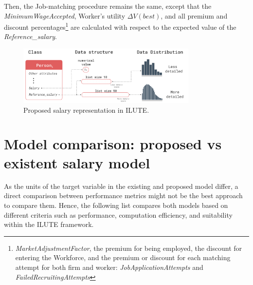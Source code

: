 Then, the Job-matching procedure remains the same, except that the \textit{MinimumWageAccepted}, Worker's utility $\Delta V(best)$, and all premium and discount percentages\footnote{\textit{MarketAdjustmentFactor}, the premium for being employed, the discount for entering the Workforce, and the premium or discount for each matching attempt for both firm and worker: \textit{JobApplicationAttempts} and \textit{FailedRecruitingAttempts}} are calculated with respect to the expected value of the \textit{Reference\_salary}.

\begin{figure}[h]
    \centering
    \includegraphics[width=0.8\textwidth]{images/ch6_class_person/class_person.png}
    \caption{Proposed salary representation in ILUTE.}
    \setlength{\abovecaptionskip}{-15pt}
    \label{fig:class_person}
\end{figure}

\section{Model comparison: proposed vs existent salary model}

As the units of the target variable in the existing and proposed model differ, a direct comparison between performance metrics might not be the best approach to compare them. Hence, the following list compares both models based on different criteria such as performance, computation efficiency, and suitability within the ILUTE framework.

